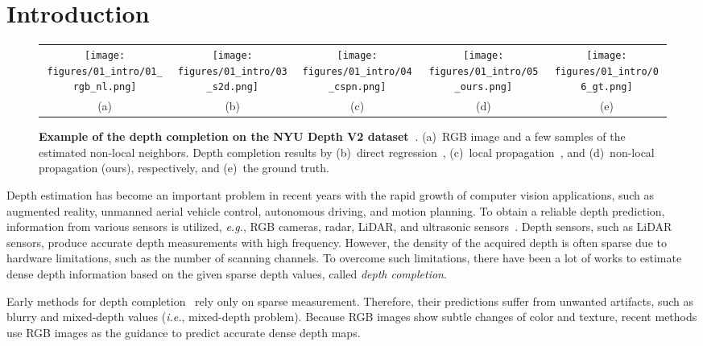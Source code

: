 \documentclass[runningheads]{llncs}
\newcommand{\ie}{\textit{i.e.}}
\newcommand{\eg}{\textit{e.g.}}
\newcommand{\csmall}{\fontsize{8}{9.5}\selectfont}
\begin{document}
\section{Introduction}
\label{sec:intro}





\begin{figure}[t]
\begin{center}
\begin{tabular}{@{}c@{\hskip 0.001\linewidth}c@{\hskip 0.001\linewidth}c@{\hskip 0.001\linewidth}c@{\hskip 0.001\linewidth}c}
\texttt{[image: figures/01\_intro/01\_rgb\_nl.png]} &
\texttt{[image: figures/01\_intro/03\_s2d.png]} &
\texttt{[image: figures/01\_intro/04\_cspn.png]} &
\texttt{[image: figures/01\_intro/05\_ours.png]} &
\texttt{[image: figures/01\_intro/06\_gt.png]} \\
{\csmall (a)} & {\csmall (b)} & {\csmall (c)} & {\csmall (d)} & {\csmall (e)}
\end{tabular}
\caption{
\textbf{Example of the depth completion on the NYU Depth V2 dataset~\cite{silberman2012indoor}}. 
(a)~RGB image and a few samples of the estimated non-local neighbors. Depth completion results by (b)~direct regression~\cite{ma2018sparse}, (c)~local propagation~\cite{cheng2018depth}, and (d)~non-local propagation (ours), respectively, and (e)~the ground truth. 
}
\label{fig:intro}
\end{center}
\end{figure}


Depth estimation has become an important problem in recent years with the rapid growth of computer vision applications, such as augmented reality, unmanned aerial vehicle control, autonomous driving, and motion planning. 
To obtain a reliable depth prediction, information from various sensors is utilized, \eg, RGB cameras, radar, LiDAR, and ultrasonic sensors~\cite{tesla_autopilot,uber_atg}. 
Depth sensors, such as LiDAR sensors, produce accurate depth measurements with high frequency. 
However, the density of the acquired depth is often sparse due to hardware limitations, such as the number of scanning channels. 
To overcome such limitations, there have been a lot of works to estimate dense depth information based on the given sparse depth values, called \textit{depth completion}.

Early methods for depth completion~\cite{uhrig2017sparsity,chodosh2018deep} rely only on sparse measurement. Therefore, their predictions suffer from unwanted artifacts, such as blurry and mixed-depth values (\ie, mixed-depth problem).
Because RGB images show subtle changes of color and texture, recent methods use RGB images as the guidance to predict accurate dense depth maps.
\end{document}
